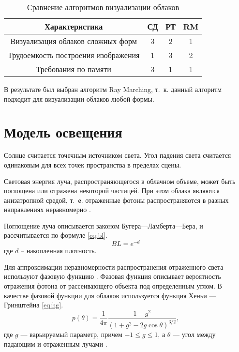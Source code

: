 \begin{table}[h]
	\begin{center}
		\begin{threeparttable}
			\captionsetup{justification=raggedright,singlelinecheck=off}
			\caption{Сравнение алгоритмов визуализации облаков}
			\label{tbl:rend_choice}
			\begin{tabular}{|c|c|c|c|}
				\hline
				Характеристика &  СД  & РТ & RM \\
				\hline
				Визуализация облаков сложных форм &  3  & 2 & 1 \\
				\hline
				Трудоемкость построения изображения &  1  & 3 & 2 \\
				\hline
				Требования по памяти & 3 & 1 & 1 \\
				\hline
			\end{tabular}
		\end{threeparttable}
	\end{center}
\end{table}

В результате был выбран алгоритм Ray Marching, т.~к. данный алгоритм подходит для визуализации облаков любой формы.

\section{Модель освещения}

Солнце считается точечным источником света. Угол падения света считается одинаковым для всех точек пространства в пределах сцены.

Световая энергия луча, распространяющегося в облачном объеме, может быть поглощена или отражена некоторой частицей. При этом облака являются анизатропной средой, т.~е. отраженные фотоны распространяются в разных направлениях неравномерно \cite{clouds, partmedia, hzd, frostbite}.

Поглощение луча описывается законом Бугера---Ламберта---Бера, и рассчитывается по формуле \eqref{eq:bl}.
\begin{equation}
	\label{eq:bl}
	BL = e ^ {-d}
\end{equation}
где $ d $ -- накопленная плотность.


Для аппроксимации неравномерности распространения отраженного света используют фазовую функцию \cite{partmedia, hzd, frostbite, clouds}.
Фазовая функция описывает вероятность отражения фотона от рассеивающего объекта под определенным углом. 
В качестве фазовой функции для облаков используется функция Хеньи --- Гринштейна \eqref{eq:hg}.  
\begin{equation}
	\label{eq:hg}
	p(\theta) = \frac{1}{4\pi} \frac{1 - g^2}{(1 + g^2 - 2g\cos \theta)^{3/2}},
\end{equation}
где $ g $ --- варьируемый параметр, причем $ -1 \leq g \leq 1 $, а $\theta$ --- угол между падающим и отраженным лучами \cite{clouds}.


